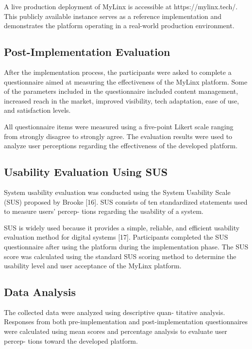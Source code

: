 \documentclass[conference]{IEEEtran}
\begin{document}
A live production deployment of MyLinx is accessible at https://mylinx.tech/. This publicly available instance serves as a reference implementation and demonstrates the platform operating in a real-world production environment.

\subsection{Post-Implementation Evaluation}

After the implementation process, the participants were asked to complete a questionnaire aimed at measuring the effectiveness of the MyLinx platform. Some of the parameters included in the questionnaire included content management, increased reach in the market, improved visibility, tech adaptation, ease of use, and satisfaction levels.

All questionnaire items were measured using a five-point Likert scale ranging from strongly disagree to strongly agree. The evaluation results were used to analyze user perceptions regarding the effectiveness of the developed platform.

\subsection{Usability Evaluation Using SUS}

System usability evaluation was conducted using the System Usability Scale (SUS) proposed by Brooke [16]. SUS consists of ten standardized statements used to measure users’ percep- tions regarding the usability of a system.

SUS is widely used because it provides a simple, reliable, and efficient usability evaluation method for digital systems [17]. Participants completed the SUS questionnaire after using the platform during the implementation phase. The SUS score was calculated using the standard SUS scoring method to determine the usability level and user acceptance of the MyLinx platform.

\subsection{Data Analysis}

The collected data were analyzed using descriptive quan- titative analysis. Responses from both pre-implementation and post-implementation questionnaires were calculated using mean scores and percentage analysis to evaluate user percep- tions toward the developed platform.
\end{document}
